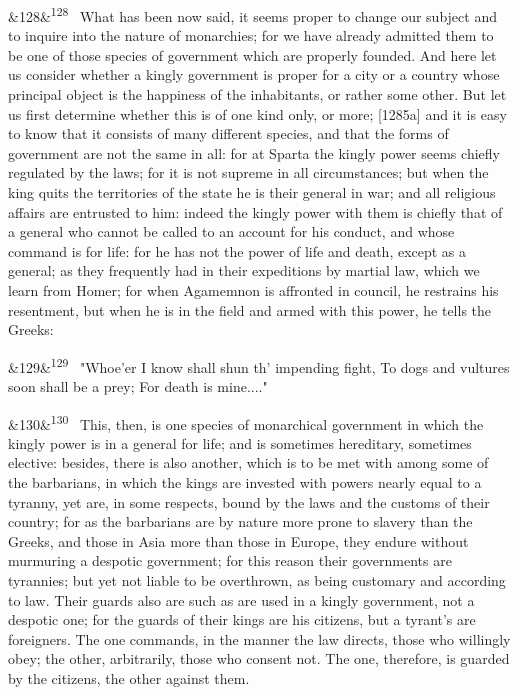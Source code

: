 \documentclass[12pt]{article}
\newcommand{\para}[1][]{\par\noindent\ifx&#1&\else\textsuperscript{\footnotesize #1}~\fi}
\begin{document}
\para[128] What has been now said, it seems proper to change our subject and to inquire into the nature of monarchies; for we have already admitted them to be one of those species of government which are properly founded. And here let us consider whether a kingly government is proper for a city or a country whose principal object is the happiness of the inhabitants, or rather some other. But let us first determine whether this is of one kind only, or more; [1285a] and it is easy to know that it consists of many different species, and that the forms of government are not the same in all: for at Sparta the kingly power seems chiefly regulated by the laws; for it is not supreme in all circumstances; but when the king quits the territories of the state he is their general in war; and all religious affairs are entrusted to him: indeed the kingly power with them is chiefly that of a general who cannot be called to an account for his conduct, and whose command is for life: for he has not the power of life and death, except as a general; as they frequently had in their expeditions by martial law, which we learn from Homer; for when Agamemnon is affronted in council, he restrains his resentment, but when he is in the field and armed with this power, he tells the Greeks:

\para[129] "Whoe'er I know shall shun th' impending fight, To dogs and vultures soon shall be a prey; For death is mine...."

\para[130] This, then, is one species of monarchical government in which the kingly power is in a general for life; and is sometimes hereditary, sometimes elective: besides, there is also another, which is to be met with among some of the barbarians, in which the kings are invested with powers nearly equal to a tyranny, yet are, in some respects, bound by the laws and the customs of their country; for as the barbarians are by nature more prone to slavery than the Greeks, and those in Asia more than those in Europe, they endure without murmuring a despotic government; for this reason their governments are tyrannies; but yet not liable to be overthrown, as being customary and according to law. Their guards also are such as are used in a kingly government, not a despotic one; for the guards of their kings are his citizens, but a tyrant's are foreigners. The one commands, in the manner the law directs, those who willingly obey; the other, arbitrarily, those who consent not. The one, therefore, is guarded by the citizens, the other against them.
\end{document}
